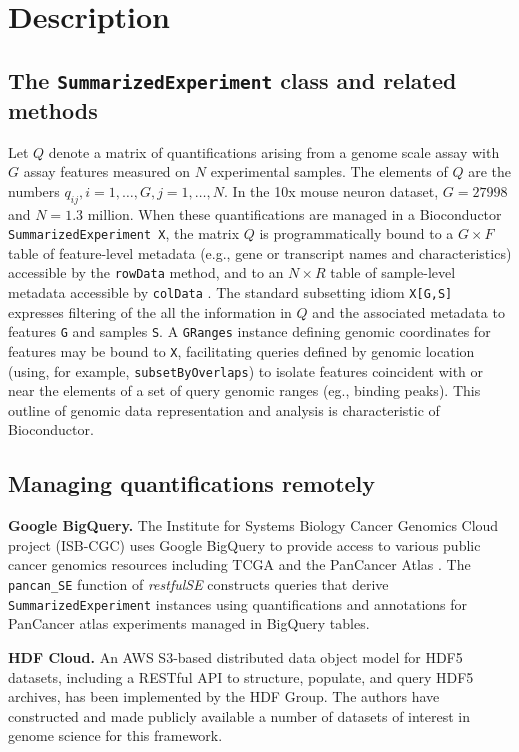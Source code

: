 \documentclass[applications]{gen-bioinformatics}
\newcommand{\Biocpackage}[1]{{\textit{#1}}}
\begin{document}
\section*{Description}

\subsection*{The \texttt{SummarizedExperiment} class and related methods}

Let $Q$ denote a matrix of quantifications arising from a genome
scale assay with $G$ assay features measured on $N$ experimental
samples.  The elements of $Q$ are the numbers $q_{ij}, i = 1, \ldots, G,
j = 1, \ldots, N$.  In the 10x mouse neuron dataset, $G=27998$ and $N=1.3$ million.
When these quantifications are managed in a Bioconductor \texttt{SummarizedExperiment X}, the matrix $Q$ is programmatically bound to a $G \times F$
table of feature-level metadata (e.g., gene or transcript names and
characteristics) accessible by the \texttt{rowData} method, and to an $N \times R$ table of sample-level metadata accessible by \texttt{colData} \citep{Huber2015}. 
The standard subsetting idiom \texttt{X[G,S]} expresses filtering of 
the all the information in $Q$ and the associated metadata
to features \texttt{G} and samples \texttt{S}.  A \texttt{GRanges} 
instance \citep{Lawrence2013} defining genomic coordinates for features may be bound to \texttt{X},
facilitating queries defined by genomic location (using, for example, \texttt{subsetByOverlaps}) to isolate features
coincident with or near the elements of a set of query genomic ranges (eg., binding peaks).  This outline of genomic data representation
and analysis is characteristic of Bioconductor.

\subsection*{Managing quantifications remotely}

\noindent
\textbf{Google BigQuery.} The Institute for Systems Biology Cancer
Genomics Cloud project (ISB-CGC) \citep{ISBCGC} uses 
Google BigQuery to provide access to
various public cancer genomics resources including
TCGA and the PanCancer Atlas \citep{Hoadley2018}.
The \verb+pancan_SE+
function of \Biocpackage{restfulSE} constructs queries that derive
\texttt{SummarizedExperiment} instances using quantifications and annotations
for PanCancer atlas experiments
managed in BigQuery tables.  

\noindent
\textbf{HDF Cloud.}
An AWS S3-based distributed data object model for
HDF5 datasets, including a
RESTful API to structure, populate, and query HDF5 archives,  has been implemented by the HDF Group. The authors have constructed and
made publicly available a
number of datasets of interest in genome science for this framework.
\end{document}
